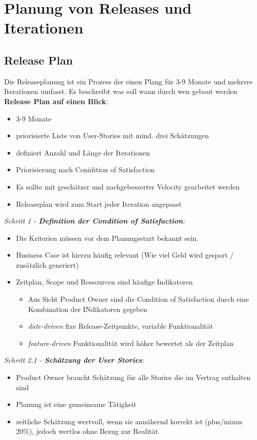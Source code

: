 \documentclass{report}
\theoremstyle{definition}
\theoremstyle{example}
\begin{document}
\section{Planung von Releases und Iterationen}
\subsection{Release Plan}
Die Releaseplanung ist ein Prozess der einen Plang für 3-9 Monate und mehrere Iterationen umfasst. Es beschreibt was soll wann durch wen gebaut werden\\
\textbf{Release Plan auf einen Blick}:
\begin{itemize}
	\item 3-9 Monate
	\item priorisierte Liste von User-Stories mit mind. drei Schätzungen
	\item definiert Anzahl und Länge der Iterationen
	\item Priorisierung nach Conidition of Satisfaction
	\item Es sollte mit geschätzer und nachgebesserter Velocity gearbeitet werden
	\item Releaseplan wird zum Start jeder Iteration angepasst
\end{itemize}

\textit{Schritt 1 - \textbf{Definition der Condition of Satisfaction}:}\\
\begin{itemize}
	\item Die Kriterien müssen vor dem Planungsstart bekannt sein.
	\item Business Case ist hierzu häufig relevant (Wie viel Geld wird gespart / zusätzlich generiert)
	\item {Zeitplan, Scope und Ressourcen sind häufige Indikatoren
		\begin{itemize}
			\item Aus Sicht Product Owner sind die Condition of Satisfaction durch eine Kombination der INdikatoren gegeben
			\item \textit{date-driven} fixe Release-Zeitpunkte, variable Funktionalität
			\item \textit{feature-driven} Funktionalität wird höher bewertet als der Zeitplan
		\end{itemize}
	}
\end{itemize}

\textit{Schritt 2.1 - \textbf{Schätzung der User Stories}:}\\
\begin{itemize}
	\item Product Owner braucht Schätzung für alle Stories die im Vertrag enthalten sind
	\item Planung ist eine gemeinsame Tätigkeit
	\item zeitliche Schätzung wertvoll, wenn sie annähernd korrekt ist (plus/minus 20\%), jedoch wertlos ohne Bezug zur Realität
\end{itemize}
\end{document}
